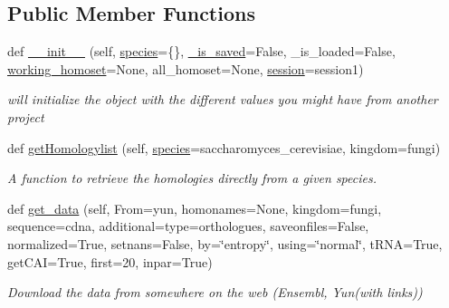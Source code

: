 \subsection*{Public Member Functions}
\begin{DoxyCompactItemize}
\item 
def \mbox{\hyperlink{class_py_c_u_b_1_1py_c_u_b_1_1_py_c_u_b_a0a8de5f32a03de2c681c0582d9998f03}{\+\_\+\+\_\+init\+\_\+\+\_\+}} (self, \mbox{\hyperlink{class_py_c_u_b_1_1py_c_u_b_1_1_py_c_u_b_a60cc232d3d52f88fe8a80244b3fcddc8}{species}}=\{\}, \mbox{\hyperlink{class_py_c_u_b_1_1py_c_u_b_1_1_py_c_u_b_aeb1012203f7072dafb43d297f76a438e}{\+\_\+is\+\_\+saved}}=False, \+\_\+is\+\_\+loaded=False, \mbox{\hyperlink{class_py_c_u_b_1_1py_c_u_b_1_1_py_c_u_b_ad3b3799416b15243c9027230dcd68482}{working\+\_\+homoset}}=None, all\+\_\+homoset=None, \mbox{\hyperlink{class_py_c_u_b_1_1py_c_u_b_1_1_py_c_u_b_a24fdc39b781fc1974625810704bd8140}{session}}=\textquotesingle{}session1\textquotesingle{})
\begin{DoxyCompactList}\small\item\em will initialize the object with the different values you might have from another project \end{DoxyCompactList}\item 
def \mbox{\hyperlink{class_py_c_u_b_1_1py_c_u_b_1_1_py_c_u_b_ae06a2843c0718f86396ee255dfc6ae6f}{get\+Homologylist}} (self, \mbox{\hyperlink{class_py_c_u_b_1_1py_c_u_b_1_1_py_c_u_b_a60cc232d3d52f88fe8a80244b3fcddc8}{species}}=\textquotesingle{}saccharomyces\+\_\+cerevisiae\textquotesingle{}, kingdom=\textquotesingle{}fungi\textquotesingle{})
\begin{DoxyCompactList}\small\item\em A function to retrieve the homologies directly from a given species. \end{DoxyCompactList}\item 
def \mbox{\hyperlink{class_py_c_u_b_1_1py_c_u_b_1_1_py_c_u_b_ac4d231f47432a18f84da1cef8673b50b}{get\+\_\+data}} (self, From=\textquotesingle{}yun\textquotesingle{}, homonames=None, kingdom=\textquotesingle{}fungi\textquotesingle{}, sequence=\textquotesingle{}cdna\textquotesingle{}, additional=\textquotesingle{}type=orthologues\textquotesingle{}, saveonfiles=False, normalized=True, setnans=False, by=\char`\"{}entropy\char`\"{}, using=\char`\"{}normal\char`\"{}, t\+R\+NA=True, get\+C\+AI=True, first=20, inpar=True)
\begin{DoxyCompactList}\small\item\em Download the data from somewhere on the web (Ensembl, Yun(with links)) \end{DoxyCompactList}\item 

\end{DoxyCompactItemize}
